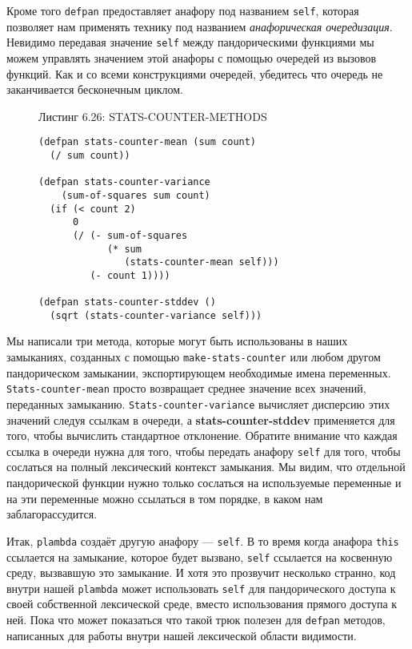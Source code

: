 Кроме того \verb"defpan" предоставляет анафору под названием \verb"self", которая позволяет нам применять технику под названием \emph{анафорическая очередизация}. Невидимо передавая значение \verb"self" между пандорическими функциями мы можем управлять значением этой анафоры с помощью очередей из вызовов функций. Как и со всеми конструкциями очередей, убедитесь что очередь не заканчивается бесконечным циклом.

\begin{figure}Листинг 6.26: STATS-COUNTER-METHODS\label{listing_6.26}
\listbegin
\begin{verbatim}
(defpan stats-counter-mean (sum count)
  (/ sum count))

(defpan stats-counter-variance
    (sum-of-squares sum count)
  (if (< count 2)
      0
      (/ (- sum-of-squares
            (* sum
               (stats-counter-mean self)))
         (- count 1))))

(defpan stats-counter-stddev ()
  (sqrt (stats-counter-variance self)))
\end{verbatim}
\listend
\end{figure}

Мы написали три метода, которые могут быть использованы в наших замыканиях, созданных с помощью \verb"make-stats-counter" или любом другом пандорическом замыкании, экспортирующем необходимые имена переменных. \verb"Stats-counter-mean" просто возвращает среднее значение всех значений, переданных замыканию. \verb"Stats-counter-variance" вычисляет дисперсию этих значений следуя ссылкам в очереди, а \foreignlanguage{english}{\textbf{stats-counter-stddev}} применяется для того, чтобы вычислить стандартное отклонение. Обратите внимание что каждая ссылка в очереди нужна для того, чтобы передать анафору \verb"self" для того, чтобы сослаться на полный лексический контекст замыкания. Мы видим, что отдельной пандорической функции нужно только сослаться на используемые переменные и на эти переменные можно ссылаться в том порядке, в каком нам заблагорассудится.

Итак, \verb"plambda" создаёт другую анафору --- \verb"self". В то время когда анафора \verb"this" ссылается на замыкание, которое будет вызвано, \verb"self" ссылается на косвенную среду, вызвавшую это замыкание. И хотя это прозвучит несколько странно, код внутри нашей \verb"plambda" может использовать \verb"self" для пандорического доступа к своей собственной лексической среде, вместо использования прямого доступа к ней. Пока что может показаться что такой трюк полезен для \verb"defpan" методов, написанных для работы внутри нашей лексической области видимости.

